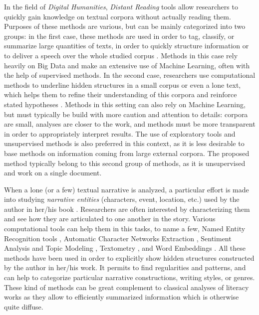 \documentclass[
twocolumn,
]{ceurart}
\begin{document}
In the field of \emph{Digital Humanities}, \emph{Distant Reading} tools \cite{Moretti2014} allow researchers to quickly gain knowledge on textual corpora without actually reading them. Purposes of these methods are various, but can be mainly categorized into two groups: in the first case, these methods are used in order to tag, classify, or summarize large quantities of texts, in order to quickly structure information or to deliver a speech over the whole studied corpus \cite{Underwood2017}. Methods in this case rely heavily on Big Data and make an extensive use of Machine Learning, often with the help of supervised methods. In the second case, researchers use computational methods to underline hidden structures in a small corpus or even a lone text, which helps them to refine their understanding of this corpora and reinforce stated hypotheses \cite{Eve2017}. Methods in this setting can also rely on Machine Learning, but must typically be build with more caution and attention to details: corpora are small, analyses are closer to the work, and methods must be more transparent in order to appropriately interpret results. The use of exploratory tools and unsupervised methods is also preferred in this context, as it is less desirable to base methods on information coming from large external corpora. The proposed method typically belong to this second group of methods, as it is unsupervised and work on a single document.

When a lone (or a few) textual narrative is analyzed, a particular effort is made into studying \emph{narrative entities} (characters, event, location, etc.) used by the author in her/his book \cite{Schmid2010}. Researchers are often interested by characterizing them and see how they are articulated to one another in the story. Various computational tools can help them in this tasks, to name a few, Named Entity Recognition tools \cite{Agarwal2013, Chaturvedi2017, Li2022}, Automatic Character Networks Extraction \cite{Labatut2019}, Sentiment Analysis and Topic Modeling \cite{Min2019}, Textometry \cite{Novakova2019}, and Word Embeddings \cite{Grayson2016, Heuser2017, Kerr2017}. All these methods have been used in order to explicitly show hidden structures constructed by the author in her/his work. It permits to find regularities and patterns, and can help to categorize particular narrative constructions, writing styles, or genres. These kind of methods can be great complement to classical analyses of literacy works as they allow to efficiently summarized information which is otherwise quite diffuse.
\end{document}
